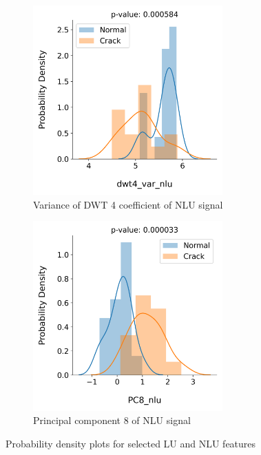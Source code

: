 \begin{figure}[tb]
\begin{subfigure}[t]{0.49\linewidth}
    \centering
    \includegraphics[width=0.8\textwidth]{fig/crack_detection_dwt4_var_nlu.png}
    \caption{Variance of DWT 4 coefficient of NLU signal}
  \end{subfigure}
  \begin{subfigure}[t]{0.49\linewidth}
    \centering
    \includegraphics[width=0.8\textwidth]{fig/crack_detection_PC8_nlu.png}
    \caption{Principal component 8 of NLU signal}
  \end{subfigure}

  \caption{Probability density plots for selected LU and NLU features}
  \label{fig: crack detection feat dist}
\end{figure}